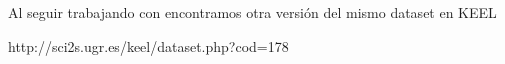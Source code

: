 \ABIERTO
Al seguir trabajando con \mushroom encontramos otra versión del mismo dataset en KEEL

http://sci2s.ugr.es/keel/dataset.php?cod=178
